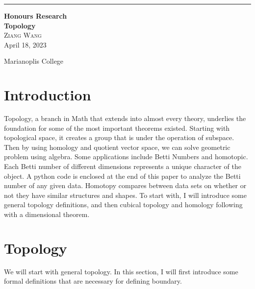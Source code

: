 \documentclass[12pt,letterpaper]{article}
\begin{document}
\begin{normalsize}
\begin{titlepage}

	\raggedleft 
	\rule{1pt}{\textheight}
	\hspace{0.05\textwidth} 
	\parbox[b]{0.75\textwidth}{ 
		{\Huge\bfseries Honours Research \\ Topology}\\[2\baselineskip]
		 
		{\Large\textsc{Ziang Wang}}  \\[10pt]
            {\Large{April 18, 2023}} 
		\vspace{0.5\textheight}
  
		{\noindent Marianoplis College~~}\\[\baselineskip]
	}
\end{titlepage}
\newpage
\tableofcontents
\newpage
\section{Introduction}
\hspace{5mm} Topology, a branch in Math that extends into almost every theory, underlies the foundation for some of the most important theorems existed. Starting with topological space, it creates a group that is under the operation of subspace. Then by using homology and quotient vector space, we can solve geometric problem using algebra. Some applications include Betti Numbers and homotopic. Each Betti number of different dimensions represents a unique character of the object. A python code is enclosed at the end of this paper to  analyze the Betti number of any given data. Homotopy compares between data sets on whether or not they have similar structures and shapes. To start with, I will introduce some general topology definitions, and then cubical topology and homology following with a dimensional theorem.
\section{Topology}
\hspace{5mm} We will start with general topology. In this section, I will first introduce some formal definitions that are necessary for defining boundary. 

\end{normalsize}
\end{document}
